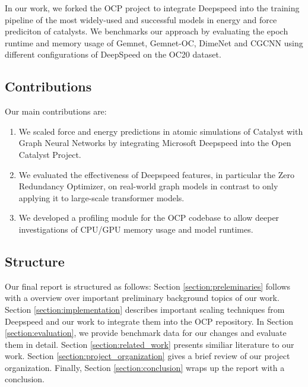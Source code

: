 In our work, we forked the OCP project to integrate Deepspeed into the training pipeline of the most widely-used 
and successful models in energy and force prediciton of catalysts. 
We benchmarks our approach by evaluating the epoch runtime and memory usage of Gemnet, Gemnet-OC, DimeNet and 
CGCNN using different configurations of DeepSpeed on the OC20 dataset.


\subsection{Contributions}

Our main contributions are:

\begin{enumerate}
    \item We scaled force and energy predictions in atomic simulations of Catalyst with Graph Neural Networks 
    by integrating Microsoft Deepspeed into the Open Catalyst Project.
    \item We evaluated the effectiveness of Deepspeed features, in particular the Zero Redundancy Optimizer, on 
    real-world graph models in contrast to only applying it to large-scale transformer models.
    \item We developed a profiling module for the OCP codebase to allow deeper investigations of CPU/GPU memory 
    usage and model runtimes.
\end{enumerate}

\subsection{Structure}

Our final report is structured as follows: Section \ref*{section:preleminaries} follows with a overview over 
important preliminary background topics of our work. Section \ref*{section:implementation} describes important 
scaling techniques from Deepspeed and our work to integrate them into the OCP repository. In Section 
\ref*{section:evaluation}, we provide benchmark data for our changes and evaluate them in detail. Section 
\ref*{section:related_work} presents similiar literature to our work. Section \ref*{section:project_organization} 
gives a brief review of our project organization. Finally, Section \ref*{section:conclusion} wraps up the 
report with a conclusion.